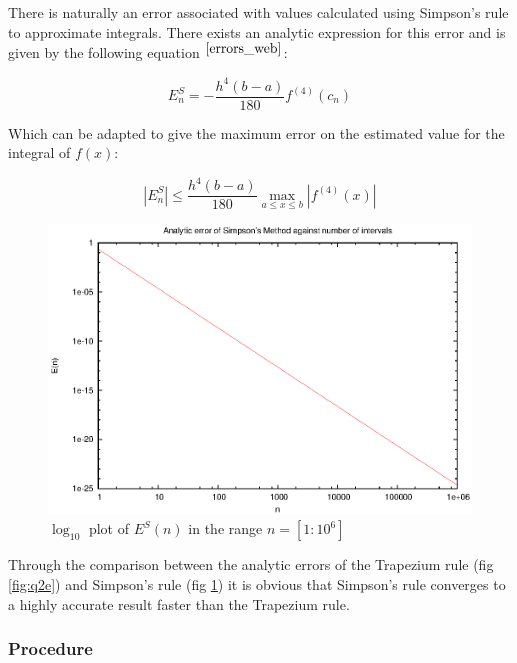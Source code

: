 \documentclass[pdf,color]{UoBnote}
\begin{document}
				There is naturally an error associated with values calculated using Simpson's rule to approximate integrals. 
			There exists an analytic expression for this error and is given by the following equation $^{\cite{errors_web}}$:
			
			
			\begin{equation} \label{eq:simps_err}
				E_n^S = -\frac{h^4\left(b-a\right)}{180}f^{(4)}(c_n)
			\end{equation}
			
			Which can be adapted to give the maximum error on the estimated value for the integral of $f(x)$:
			
			\begin{equation} \label{eq:simps_err2}
				\left|E_n^S\right| \leq \frac{h^4\left(b-a\right)}{180}\max_{a \leq x \leq b}\left|f^{(4)}(x)\right|
			\end{equation}
			
			\begin{figure}[H]
					\centering
						\includegraphics{figures/q2g.eps}
					\caption{$\log_{10}$ plot of $E^S(n)$ in the range $n = [1:10^{6}]$}
					\label{fig:q2g}
				\end{figure}
				
				Through the comparison between the analytic errors of the Trapezium rule (fig \ref{fig:q2e}) and Simpson's rule (fig \ref{fig:q2g}) it is obvious that Simpson's rule converges to a highly accurate result faster than the Trapezium rule.
					
				
			\subsubsection{Procedure}
				
\end{document}
